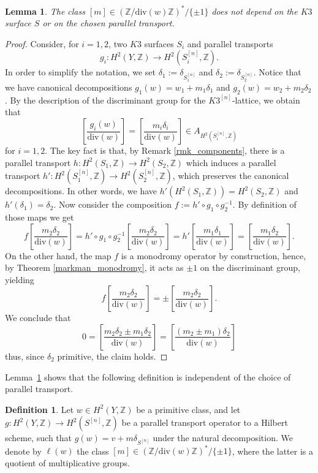 \documentclass[12pt,a4paper]{amsart}
\theoremstyle{plain}
\newtheorem{lem}[thm]{Lemma}
\theoremstyle{definition}
\newtheorem{df}[thm]{Definition}
\theoremstyle{remark}
\def\H{H}
\newcommand{\ZZ}{\mathbb{Z}}
\newcommand{\dv}{\mathrm{div}}
\begin{document}
\begin{lem}\label{lem_independencyofparalleltransport}
        The class $[m]\in(\mathbb{Z}/\dv(w)\mathbb{Z})^*/\{\pm1\}$ does not depend on the $K3$ surface $S$ or on the chosen parallel transport.
\end{lem}
\begin{proof}
    Consider, for $i=1,2$, two $K3$ surfaces $S_i$ and parallel transports
    \[
        g_i\colon \H^2(Y,\mathbb{Z})\rightarrow \H^2(S_i^{[n]},\mathbb{Z}).
    \]
    In order to simplify the notation, we set $\delta_1:=\delta_{S_1^{[n]}}$ and $\delta_2:=\delta_{S_2^{[n]}}$. Notice that we have canonical decompositions $g_1(w)=w_1+m_1\delta_1$ and $g_2(w)=w_2+m_2\delta_2$.
    By the description of the discriminant group for the $K3^{[n]}$-lattice, we obtain that
    \[
    \left[\frac{g_i(w)}{\mathrm{div}(w)}\right]=\left[\frac{m_i\delta_i}{\mathrm{div}(w)}\right]\in A_{\H^2(S_i^{[n]},\mathbb{Z})}
    \]
    for $i=1,2$.
    The key fact is that, by Remark \ref{rmk_components}, there is a parallel transport $h\colon \H^2(S_1,\mathbb{Z})\rightarrow \H^2(S_2,\mathbb{Z})$ which induces a parallel transport $h'\colon \H^2(S_1^{[n]},\mathbb{Z})\rightarrow \H^2(S_2^{[n]},\mathbb{Z})$, which preserves the canonical decompositions.
    In other words, we have $h'(\H^2(S_1,\mathbb{Z}))=\H^2(S_2,\mathbb{Z})$ and $h'(\delta_1)=\delta_2$.
    Now consider the composition $f:=h'\circ g_1\circ g_2^{-1}$.
    By definition of those maps we get 
    \[f\left[\dfrac{m_2\delta_2}{\dv(w)}\right]=h'\circ g_1\circ g_2^{-1}\left[\dfrac{m_2\delta_2}{\dv(w)}\right]=h'\left[\dfrac{m_1\delta_1}{\dv(w)}\right]=\left[\dfrac{m_1\delta_2}{\dv(w)}\right].\]
    On the other hand, the map $f$ is a monodromy operator by construction, hence, by Theorem \ref{markman_monodromy}, it acts as $\pm 1$ on the discriminant group, yielding 
    \[f\left[\dfrac{m_2\delta_2}{\dv(w)}\right]=\pm\left[\dfrac{m_2\delta_2}{\dv(w)}\right].\]
    We conclude that 
    \[0=\left[\dfrac{m_2\delta_2\pm m_1\delta_2}{\dv(w)}\right]=\left[\dfrac{(m_2\pm m_1)\delta_2}{\dv(w)}\right]\]
    thus, since $\delta_2$ primitive, the claim holds.
    \end{proof}

    Lemma~\ref{lem_independencyofparalleltransport} shows that the following definition is independent of the choice of parallel transport.
\begin{df}\label{def_invariant}
Let $w \in \H^2(Y,\mathbb{Z})$  be a primitive class, and let $g\colon \H^2(Y,\mathbb{Z})\rightarrow \H^2(S^{[n]},\mathbb{Z})$ be a parallel transport operator to a Hilbert scheme, such that $g(w)=v+m\delta_{S^{[n]}}$ under the natural decomposition. We denote by $\ell(w)$ the class $[m]\in(\ZZ/\dv(w)\ZZ)^*/\{\pm 1\}$, where the latter is a quotient of multiplicative groups.
\end{df}
\end{document}
